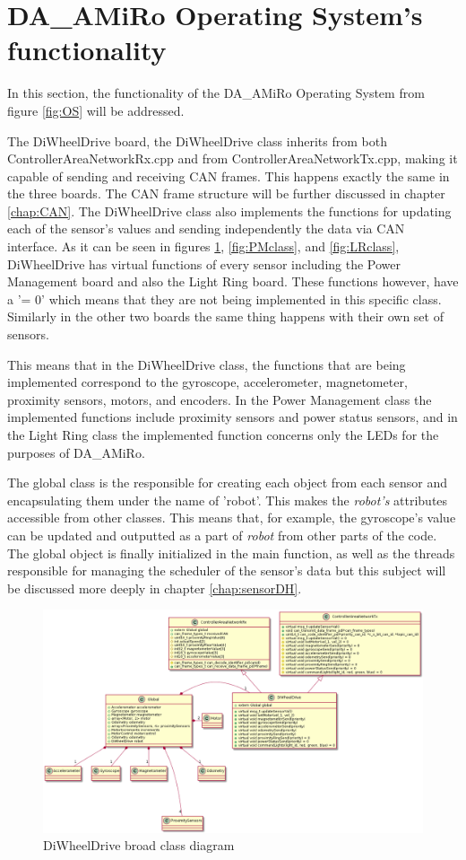 \documentclass[12pt]{report}%
\begin{document}
\section{DA\_AMiRo Operating System's functionality}
\label{sub:DAAMIROOS}
In this section, the functionality of the DA\_AMiRo Operating System from figure \ref{fig:OS} will be addressed.

The DiWheelDrive board, the DiWheelDrive class inherits from both ControllerAreaNetworkRx.cpp and from ControllerAreaNetworkTx.cpp, making it capable of sending and receiving CAN frames. This happens exactly the same in the three boards. The CAN frame structure will be further discussed in chapter \ref{chap:CAN}. The DiWheelDrive class also implements the functions for updating each of the sensor's values and sending independently the data via CAN interface. As it can be seen in figures \ref{fig:DWDclass}, \ref{fig:PMclass}, and \ref{fig:LRclass}, DiWheelDrive has virtual functions of every sensor including the Power Management board and also the Light Ring board. These functions however, have a '= 0' which means that they are not being implemented in this specific class. Similarly in the other two boards the same thing happens with their own set of sensors.

This means that in the DiWheelDrive class, the functions that are being implemented correspond to the gyroscope, accelerometer, magnetometer, proximity sensors, motors, and encoders. In the Power Management class the implemented functions include proximity sensors and power status sensors, and in the Light Ring class the implemented function concerns only the LEDs for the purposes of DA\_AMiRo.

The global class is the responsible for creating each object from each sensor and encapsulating them under the name of 'robot'. This makes the \textit{robot's} attributes accessible from other classes. This means that, for example, the gyroscope's value can be updated and outputted as a part of \textit{robot} from other parts of the code. The global object is finally initialized in the main function, as well as the threads responsible for managing the scheduler of the sensor's data but this subject will be discussed more deeply in chapter \ref{chap:sensorDH}.

\begin{figure}[ht]
	\centering
	\includegraphics[width=\textwidth]{DWDclass}
    \caption{DiWheelDrive broad class diagram}
    \label{fig:DWDclass}
\end{figure}
\end{document}
